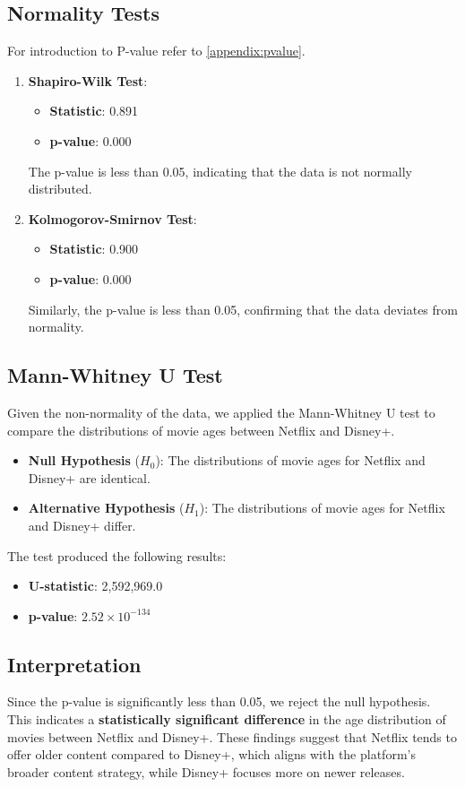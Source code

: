 \subsection*{Normality Tests}
For introduction to P-value refer to \autoref{appendix:pvalue}.
\begin{enumerate}
    \item \textbf{Shapiro-Wilk Test}:
    \begin{itemize}
        \item \textbf{Statistic}: 0.891
        \item \textbf{p-value}: 0.000
    \end{itemize}
    The p-value is less than 0.05, indicating that the data is not normally distributed.

    \item \textbf{Kolmogorov-Smirnov Test}:
    \begin{itemize}
        \item \textbf{Statistic}: 0.900
        \item \textbf{p-value}: 0.000
    \end{itemize}
    Similarly, the p-value is less than 0.05, confirming that the data deviates from normality.
\end{enumerate}

\subsection*{Mann-Whitney U Test}
Given the non-normality of the data, we applied the Mann-Whitney U test to compare the distributions of movie ages between Netflix and Disney+.
\begin{itemize}
    \item \textbf{Null Hypothesis} (\(H_0\)): The distributions of movie ages for Netflix and Disney+ are identical.
    \item \textbf{Alternative Hypothesis} (\(H_1\)): The distributions of movie ages for Netflix and Disney+ differ.
\end{itemize}

The test produced the following results:
\begin{itemize}
    \item \textbf{U-statistic}: 2,592,969.0
    \item \textbf{p-value}: \(2.52 \times 10^{-134}\)
\end{itemize}

\subsection*{Interpretation}
Since the p-value is significantly less than 0.05, we reject the null hypothesis. This indicates a \textbf{statistically significant difference} in the age distribution of movies between Netflix and Disney+. These findings suggest that Netflix tends to offer older content compared to Disney+, which aligns with the platform's broader content strategy, while Disney+ focuses more on newer releases.

